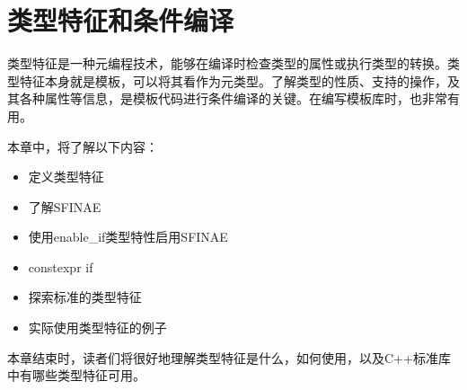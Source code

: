 \chapter{类型特征和条件编译}
类型特征是一种元编程技术，能够在编译时检查类型的属性或执行类型的转换。类型特征本身就是模板，可以将其看作为元类型。了解类型的性质、支持的操作，及其各种属性等信息，是模板代码进行条件编译的关键。在编写模板库时，也非常有用。

本章中，将了解以下内容：

\begin{itemize}
  \item 定义类型特征
  \item 了解SFINAE
  \item 使用enable_if类型特性启用SFINAE
  \item constexpr if
  \item 探索标准的类型特征
  \item 实际使用类型特征的例子
\end{itemize}

本章结束时，读者们将很好地理解类型特征是什么，如何使用，以及C++标准库中有哪些类型特征可用。









